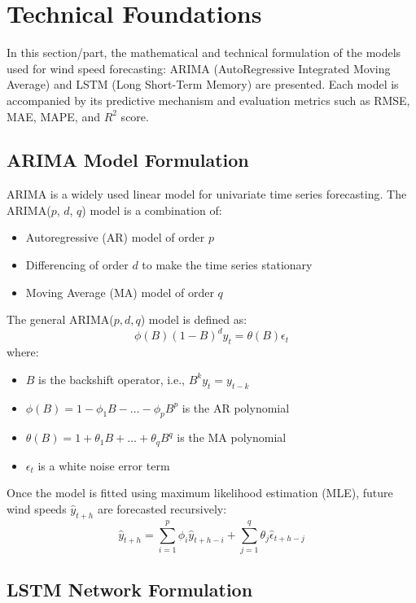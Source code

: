 \chapter{ Technical Foundations}

In this section/part, the mathematical and technical formulation of the models used for wind speed forecasting: ARIMA (AutoRegressive Integrated Moving Average) and LSTM (Long Short-Term Memory) are presented. Each model is accompanied by its predictive mechanism and evaluation metrics such as RMSE, MAE, MAPE, and $R^2$ score.

\section{ARIMA Model Formulation}

ARIMA is a widely used linear model for univariate time series forecasting. The ARIMA($p$, $d$, $q$) model is a combination of:
\begin{itemize}
	\item Autoregressive (AR) model of order $p$
	\item Differencing of order $d$ to make the time series stationary
	\item Moving Average (MA) model of order $q$
\end{itemize}

The general ARIMA($p,d,q$) model is defined as:
\begin{equation}
	\phi(B)(1 - B)^d y_t = \theta(B) \epsilon_t
\end{equation}
where:
\begin{itemize}
	\item $B$ is the backshift operator, i.e., $B^k y_t = y_{t-k}$
	\item $\phi(B) = 1 - \phi_1 B - \ldots - \phi_p B^p$ is the AR polynomial
	\item $\theta(B) = 1 + \theta_1 B + \ldots + \theta_q B^q$ is the MA polynomial
	\item $\epsilon_t$ is a white noise error term
\end{itemize}

Once the model is fitted using maximum likelihood estimation (MLE), future wind speeds $\hat{y}_{t+h}$ are forecasted recursively:
\begin{equation}
	\hat{y}_{t+h} = \sum_{i=1}^{p} \phi_i \hat{y}_{t+h-i} + \sum_{j=1}^{q} \theta_j \hat{\epsilon}_{t+h-j}
\end{equation}

\section{LSTM Network Formulation}

